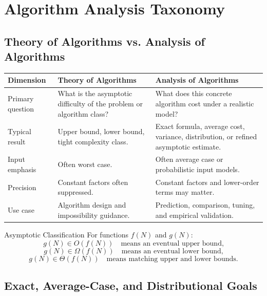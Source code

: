 \documentclass[11pt]{article}
\begin{document}
\section{Algorithm Analysis Taxonomy}

\subsection{Theory of Algorithms vs. Analysis of Algorithms}

\begin{center}
\begin{tabularx}{\textwidth}{L{0.22\textwidth} Y Y}
\toprule
\textbf{Dimension} & \textbf{Theory of Algorithms} & \textbf{Analysis of Algorithms} \\
\midrule
Primary question & What is the asymptotic difficulty of the problem or algorithm class? & What does this concrete algorithm cost under a realistic model? \\
Typical result & Upper bound, lower bound, tight complexity class. & Exact formula, average cost, variance, distribution, or refined asymptotic estimate. \\
Input emphasis & Often worst case. & Often average case or probabilistic input models. \\
Precision & Constant factors often suppressed. & Constant factors and lower-order terms may matter. \\
Use case & Algorithm design and impossibility guidance. & Prediction, comparison, tuning, and empirical validation. \\
\bottomrule
\end{tabularx}
\end{center}

\begin{mathbox}{Asymptotic Classification}
For functions \(f(N)\) and \(g(N)\):
\[
 g(N) \in O(f(N)) \quad \text{means an eventual upper bound,}
\]
\[
 g(N) \in \Omega(f(N)) \quad \text{means an eventual lower bound,}
\]
\[
 g(N) \in \Theta(f(N)) \quad \text{means matching upper and lower bounds.}
\]
\end{mathbox}

\subsection{Exact, Average-Case, and Distributional Goals}
\end{document}

